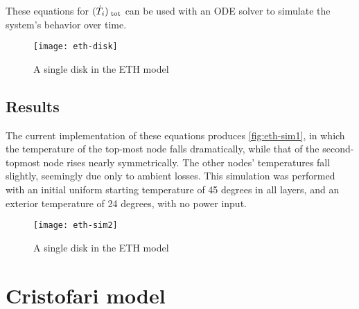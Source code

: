 \documentclass{article}
\begin{document}
These equations for $(\dot{T}_{i})_{\;\text{tot}}$ can be used with an ODE solver to simulate the system's behavior over time.

\begin{figure}
   \centering
   \texttt{[image: eth-disk]}
   \caption{A single disk in the ETH model}
   \label{fig:eth-disk}
\end{figure}

\subsection{Results}

The current implementation of these equations produces \autoref{fig:eth-sim1}, in which the temperature of the top-most node falls dramatically, while that of the second-topmost node rises nearly symmetrically.
The other nodes' temperatures fall slightly, seemingly due only to ambient losses.
This simulation was performed with an initial uniform starting temperature of 45 degrees in all layers, and an exterior temperature of 24 degrees, with no power input.

\begin{figure}
   \centering
   \texttt{[image: eth-sim2]}
   \caption{A single disk in the ETH model}
   \label{fig:eth-sim1}
\end{figure}

\section{Cristofari model}

\cite{Cristofari02}

\clearpage
\printbibliography[heading = bibintoc]
\end{document}
